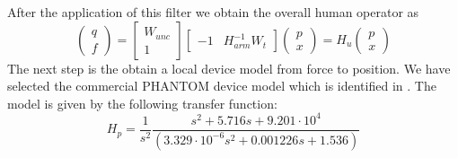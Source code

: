 \documentclass{article}
\newcommand{\bmatr}[1]{\begin{bmatrix}#1\end{bmatrix}}
\newcommand{\pmatr}[1]{\begin{pmatrix}#1\end{pmatrix}}
\newcommand{\inv}[1]{#1^{-1}}
\begin{document}
After the application of this filter we obtain the overall human operator as
\[
\pmatr{q\\f} = \bmatr{W_{unc}\\1}\bmatr{-1 &\inv{H_{arm}}W_t}\pmatr{p\\x} = H_u \pmatr{p\\x}
\]
The next step is the obtain a local device model from force to position. We have selected the commercial PHANTOM device model which is identified in \cite{cavusfeygintendick}. The model is given by the following transfer function: 
\[
H_p = \frac{1}{s^2}\frac{s^2 + 5.716 s + 9.201\cdot 10^{4}}{(3.329\cdot 10^{-6} s^2 + 0.001226 s+1.536)}
\]

%
%
\printbibliography
\end{document}
